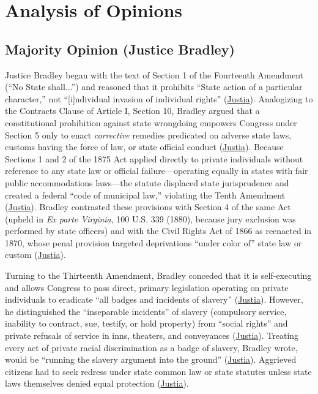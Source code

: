 \documentclass[12pt]{article}
\begin{document}
\section{Analysis of Opinions}

\subsection{Majority Opinion (Justice Bradley)}

Justice Bradley began with the text of Section 1 of the Fourteenth Amendment (``No State shall...'') and reasoned that it prohibits ``State action of a particular character,'' not ``[i]ndividual invasion of individual rights'' (\href{https://supreme.justia.com/cases/federal/us/109/3/}{Justia}). Analogizing to the Contracts Clause of Article I, Section 10, Bradley argued that a constitutional prohibition against state wrongdoing empowers Congress under Section 5 only to enact \textit{corrective} remedies predicated on adverse state laws, customs having the force of law, or state official conduct (\href{https://supreme.justia.com/cases/federal/us/109/3/}{Justia}). Because Sections 1 and 2 of the 1875 Act applied directly to private individuals without reference to any state law or official failure---operating equally in states with fair public accommodations laws---the statute displaced state jurisprudence and created a federal ``code of municipal law,'' violating the Tenth Amendment (\href{https://supreme.justia.com/cases/federal/us/109/3/}{Justia}). Bradley contrasted these provisions with Section 4 of the same Act (upheld in \textit{Ex parte Virginia}, 100 U.S. 339 (1880), because jury exclusion was performed by state officers) and with the Civil Rights Act of 1866 as reenacted in 1870, whose penal provision targeted deprivations ``under color of'' state law or custom (\href{https://supreme.justia.com/cases/federal/us/109/3/}{Justia}).

Turning to the Thirteenth Amendment, Bradley conceded that it is self-executing and allows Congress to pass direct, primary legislation operating on private individuals to eradicate ``all badges and incidents of slavery'' (\href{https://supreme.justia.com/cases/federal/us/109/3/}{Justia}). However, he distinguished the ``inseparable incidents'' of slavery (compulsory service, inability to contract, sue, testify, or hold property) from ``social rights'' and private refusals of service in inns, theaters, and conveyances (\href{https://supreme.justia.com/cases/federal/us/109/3/}{Justia}). Treating every act of private racial discrimination as a badge of slavery, Bradley wrote, would be ``running the slavery argument into the ground'' (\href{https://supreme.justia.com/cases/federal/us/109/3/}{Justia}). Aggrieved citizens had to seek redress under state common law or state statutes unless state laws themselves denied equal protection (\href{https://supreme.justia.com/cases/federal/us/109/3/}{Justia}).
\end{document}
